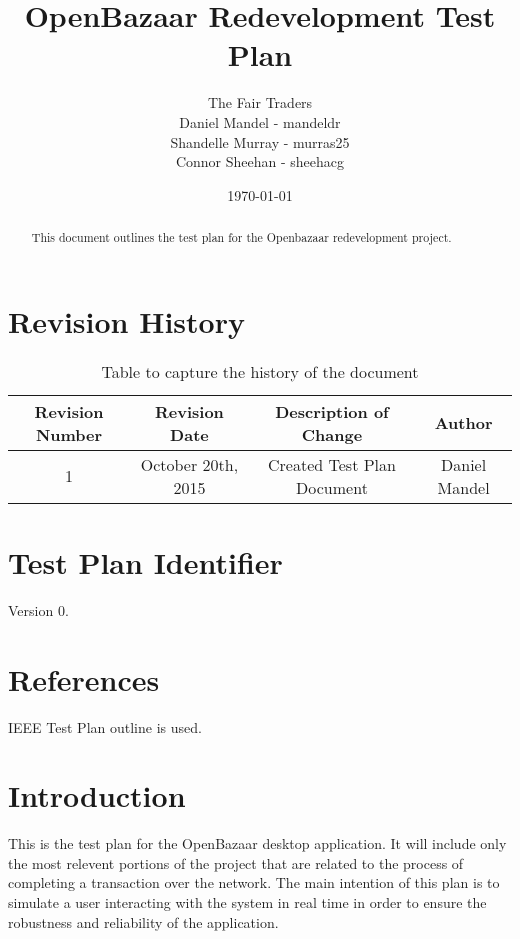 \documentclass{article}
\begin{document}
\title{OpenBazaar Redevelopment Test Plan}
\author{The Fair Traders \\ Daniel Mandel - mandeldr \\ Shandelle Murray - murras25 \\ Connor Sheehan - sheehacg}
\date{\today}
\maketitle

\begin{abstract}
This document outlines the test plan for the Openbazaar redevelopment project.
\end{abstract}

\clearpage

\tableofcontents

\clearpage

\section*{Revision History}

\begin{table}[h!]
\centering
\begin{tabular}{||c c c c||} 
 \hline
 Revision Number & Revision Date & Description of Change & Author \\ [0.5ex] 
 \hline\hline
 1 & October 20th, 2015 & Created Test Plan Document & Daniel Mandel \\ [1ex] 
 \hline
\end{tabular}
\caption{Table to capture the history of the document}
\label{table:1}
\end{table}


\section*{Test Plan Identifier}
Version 0.

\section*{References}
IEEE Test Plan outline is used.

\section*{Introduction}
This is the test plan for the OpenBazaar desktop application.
It will include only the most relevent portions of the project that are related to the process of completing a transaction over the network.
The main intention of this plan is to simulate a user interacting with the system in real time in order to ensure the robustness and reliability of the application.
\end{document}
